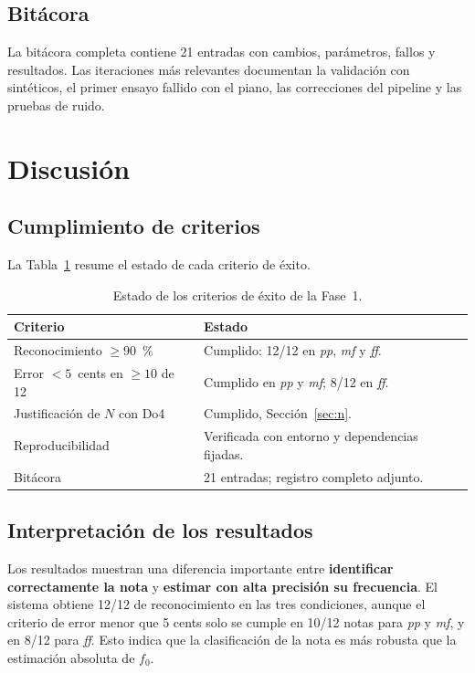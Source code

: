 \documentclass[12pt]{article}
\begin{document}
\subsection{Bitácora}
La bitácora completa contiene 21 entradas con cambios, parámetros, fallos y resultados.
Las iteraciones más relevantes documentan la validación con sintéticos, el primer ensayo
fallido con el piano, las correcciones del pipeline y las pruebas de ruido.

\section{Discusión}
\label{sec:discusion}

\subsection{Cumplimiento de criterios}
La Tabla~\ref{tab:criterios} resume el estado de cada criterio de éxito.
\begin{table}[ht]
  \centering
  \footnotesize
  \begin{tabular}{p{5.2cm}p{8.6cm}}
    \toprule
    \rowcolor{TableHead}
    Criterio & Estado \\
    \midrule
    Reconocimiento $\ge90$~\% & Cumplido: 12/12 en \emph{pp}, \emph{mf} y \emph{ff}. \\
    Error $<5$~cents en $\ge10$ de 12 & Cumplido en \emph{pp} y \emph{mf}; 8/12 en \emph{ff}. \\
    Justificación de $N$ con Do4 & Cumplido, Sección~\ref{sec:n}. \\
    Reproducibilidad & Verificada con entorno y dependencias fijadas. \\
    Bitácora & 21 entradas; registro completo adjunto. \\
    \bottomrule
  \end{tabular}
  \caption{Estado de los criterios de éxito de la Fase~1.}
  \label{tab:criterios}
\end{table}

\subsection{Interpretación de los resultados}

Los resultados muestran una diferencia importante entre \textbf{identificar
correctamente la nota} y \textbf{estimar con alta precisión su frecuencia}.
El sistema obtiene 12/12 de reconocimiento en las tres condiciones, aunque el
criterio de error menor que 5 cents solo se cumple en 10/12 notas para \emph{pp}
y \emph{mf}, y en 8/12 para \emph{ff}. Esto indica que la clasificación de la nota
es más robusta que la estimación absoluta de $f_0$.
\end{document}
